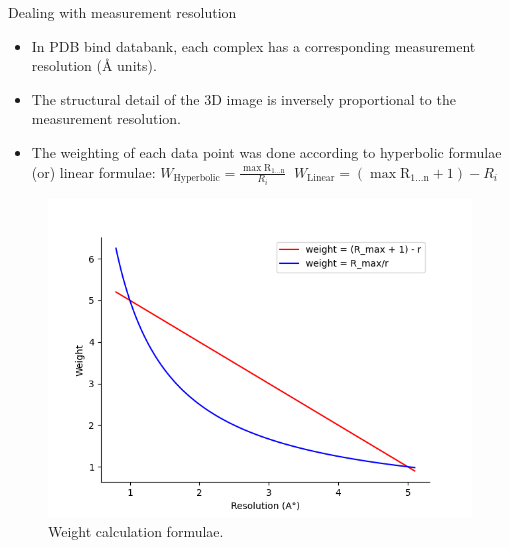 \documentclass{beamer}
\begin{document}
\begin{frame}[t]{Dealing with measurement resolution}
\begin{itemize}
\item In PDB bind databank,  each complex has a corresponding measurement resolution (\si{\angstrom} units).
\item The structural
detail of the 3D image is inversely proportional to the measurement
resolution.
\item The weighting of each data point was done according to hyperbolic formulae (or) linear formulae:
$ W_\mathrm{Hyperbolic} = \frac{ \mathrm{\max{R_{1 ...  n}}}}{R_i}  \;\; W_\mathrm{Linear}  = (\mathrm{\max{R_{1 ...  n}}} + 1) - R_i $
\end{itemize}

\begin{figure}
     \centering
         \centering
    \includegraphics[scale=0.30]{images/graphingformula}
    \caption{Weight calculation formulae.}
    \label{fig:graphingformula}
\end{figure}

\end{frame}
\end{document}
